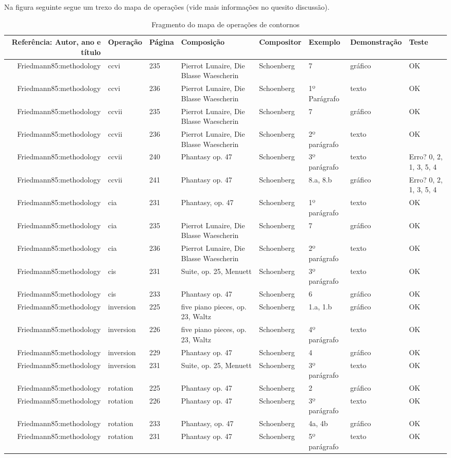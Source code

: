 \documentclass[11pt]{article}
\begin{document}
Na figura seguinte segue um trexo do mapa de operações (vide mais informações no
quesito discussão).
\begin{table}
  \centering
  \begin{tabular}{r|lllllll}
    Referência: Autor, ano e título&Operação&Página&Composição&Compositor&Exemplo&Demonstração&Teste\\
    \hline
    Friedmann85:methodology&ccvi&235&Pierrot Lunaire, Die Blasse Waescherin&Schoenberg&7&gráfico&OK\\
    Friedmann85:methodology&ccvi&236&Pierrot Lunaire, Die Blasse Waescherin&Schoenberg&1º Parágrafo&texto&OK\\
    Friedmann85:methodology&ccvii&235&Pierrot Lunaire, Die Blasse Waescherin&Schoenberg&7&gráfico&OK\\
    Friedmann85:methodology&ccvii&236&Pierrot Lunaire, Die Blasse Waescherin&Schoenberg&2º parágrafo&texto&OK\\
    Friedmann85:methodology&ccvii&240&Phantasy op. 47&Schoenberg&3º parágrafo&texto&Erro? 0, 2, 1, 3, 5, 4\\
    Friedmann85:methodology&ccvii&241&Phantasy op. 47&Schoenberg&8.a, 8.b&gráfico&Erro? 0, 2, 1, 3, 5, 4\\
    Friedmann85:methodology&cia&231&Phantasy, op. 47&Schoenberg&1º parágrafo&texto&OK\\
    Friedmann85:methodology&cia&235&Pierrot Lunaire, Die Blasse Waescherin&Schoenberg&7&gráfico&OK\\
    Friedmann85:methodology&cia&236&Pierrot Lunaire, Die Blasse Waescherin&Schoenberg&2º parágrafo&texto&OK\\
    Friedmann85:methodology&cis&231&Suite, op. 25, Menuett&Schoenberg&3º parágrafo&texto&OK\\
    Friedmann85:methodology&cis&233&Phantasy op. 47&Schoenberg&6&gráfico&OK\\
    Friedmann85:methodology&inversion&225&five piano pieces, op. 23, Waltz&Schoenberg&1.a, 1.b&gráfico&OK\\
    Friedmann85:methodology&inversion&226&five piano pieces, op. 23, Waltz&Schoenberg&4º parágrafo&texto&OK\\
    Friedmann85:methodology&inversion&229&Phantasy op. 47&Schoenberg&4&gráfico&OK\\
    Friedmann85:methodology&inversion&231&Suite, op. 25, Menuett&Schoenberg&3º parágrafo&texto&OK\\
    Friedmann85:methodology&rotation&225&Phantasy op. 47&Schoenberg&2&gráfico&OK\\
    Friedmann85:methodology&rotation&226&Phantasy op. 47&Schoenberg&3º parágrafo&texto&OK\\
    Friedmann85:methodology&rotation&233&Phantasy, op. 47&Schoenberg&4a, 4b&gráfico&OK\\
    Friedmann85:methodology&rotation&231&Phantasy op. 47&Schoenberg&5º parágrafo&texto&OK\\
  \end{tabular}
  \caption{Fragmento do mapa de operações de contornos}
  \label{tab:mapa-operacoes}
\end{table}
\end{document}
